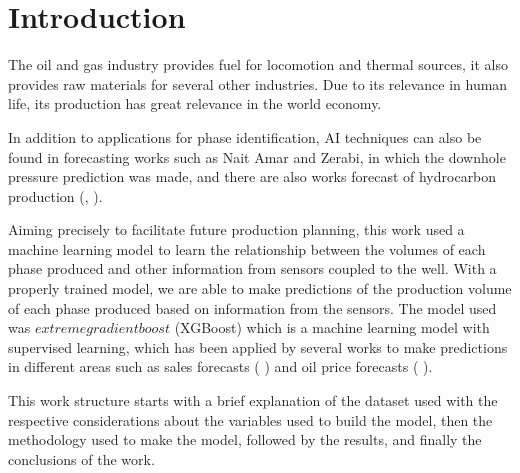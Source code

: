 \section{Introduction}
\label{sec:Introduction}

The oil and gas industry provides fuel for locomotion and thermal sources, it also provides raw materials for several other industries.
Due to its relevance in human life, its production has great relevance in the world economy.



In addition to applications for phase identification, AI techniques can also be found in forecasting works such as Nait Amar and Zerabi\cite{nait2020combined}, in which the downhole pressure prediction was made, and there are also works forecast of hydrocarbon production (\cite{cao2016data}, \cite{zanjani2020data}).

Aiming precisely to facilitate future production planning, this work used a machine learning model to learn the relationship between the volumes of each phase produced and other information from sensors coupled to the well. With a properly trained model, we are able to make predictions of the production volume of each phase produced based on information from the sensors. The model used was $extreme gradient boost$ (XGBoost)\cite{chen2016xgboost} which is a machine learning model with supervised learning, which has been applied by several works to make predictions in different areas such as sales forecasts (\cite{shilong2021machine} ) and oil price forecasts ( \cite{gumus2017crude}).

This work structure starts with a brief explanation of the dataset used with the respective considerations about the variables used to build the model, then the methodology used to make the model, followed by the results, and finally the conclusions of the work.
